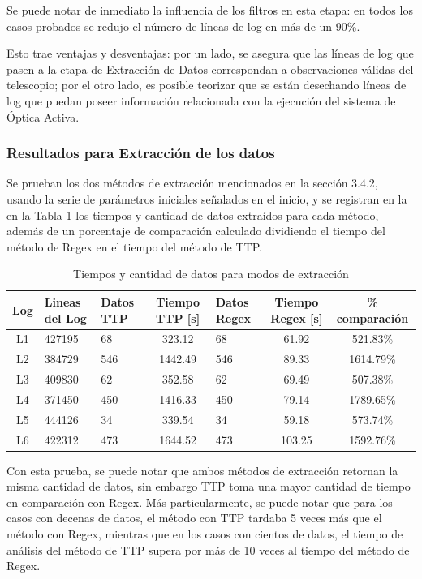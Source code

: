 Se puede notar de inmediato la influencia de los filtros en esta etapa: en todos los casos probados se redujo el número de líneas de log en más de un 90\%.

Esto trae ventajas y desventajas: por un lado, se asegura que las líneas de log que pasen a la etapa de Extracción de Datos correspondan a observaciones válidas del telescopio; por el otro lado, es posible teorizar que se están desechando líneas de log que puedan poseer información relacionada con la ejecución del sistema de Óptica Activa.

\subsubsection{Resultados para Extracción de los datos}

Se prueban los dos métodos de extracción mencionados en la sección 3.4.2, usando la serie de parámetros iniciales señalados en el inicio, y se registran en la en la Tabla \ref{table:etapa2} los tiempos y cantidad de datos extraídos para cada método, además de un porcentaje de comparación calculado dividiendo el tiempo del método de Regex en el tiempo del método de TTP.

\begin{table}[h]
    \centering
    \ttfamily
    \begin{tabular}{|c|p{1.5cm}|p{1cm}|c|p{1.1cm}|c|c|}
        \hline
        Log & Lineas del Log & Datos TTP & Tiempo TTP [s] & Datos Regex & Tiempo Regex [s] & \% comparación\\
        \hline \hline 
        L1 & 427195 & 68 & 323.12 & 68 & 61.92 & 521.83\% \\
        \hline
        L2 & 384729 & 546 & 1442.49 & 546 & 89.33 & 1614.79\% \\
        \hline
        L3 & 409830 & 62 & 352.58 & 62 & 69.49 & 507.38\% \\
        \hline
        L4 & 371450 & 450 & 1416.33 & 450 & 79.14 & 1789.65\% \\
        \hline
        L5 & 444126 & 34 & 339.54 & 34 & 59.18 & 573.74\% \\
        \hline
        L6 & 422312 & 473 & 1644.52 & 473 & 103.25 & 1592.76\% \\
        \hline
    \end{tabular}
    \caption{\label{table:etapa2} Tiempos y cantidad de datos para modos de extracción}
\end{table}

Con esta prueba, se puede notar que ambos métodos de extracción retornan la misma cantidad de datos, sin embargo TTP toma una mayor cantidad de tiempo en comparación con Regex. Más particularmente, se puede notar que para los casos con decenas de datos, el método con TTP tardaba 5 veces más que el método con Regex, mientras que en los casos con cientos de datos, el tiempo de análisis del método de TTP supera por más de 10 veces al tiempo del método de Regex.

